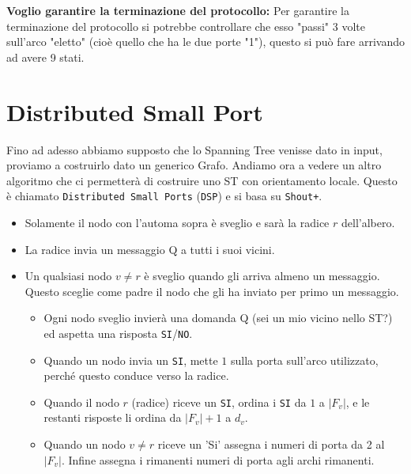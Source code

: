 \textbf{Voglio garantire la terminazione del protocollo: }
Per garantire la terminazione del protocollo si potrebbe controllare che esso
"passi" 3 volte sull'arco "eletto" (cioè quello che ha le due porte "1"), questo
si può fare arrivando ad avere 9 stati.

\section{Distributed Small Port}
Fino ad adesso abbiamo supposto che lo Spanning Tree venisse dato in input,
proviamo a costruirlo dato un generico Grafo. Andiamo ora a vedere un altro
algoritmo che ci permetterà di costruire uno ST con orientamento locale. Questo
è chiamato \texttt{Distributed Small Ports} (\texttt{DSP}) e si basa su
\texttt{Shout+}.
\begin{itemize}
    \item Solamente il nodo con l'automa sopra è sveglio e sarà la radice $r$
          dell'albero.
    \item La radice invia un messaggio Q a tutti i suoi vicini.
    \item Un qualsiasi nodo $v \neq r$ è sveglio quando gli arriva almeno un
          messaggio. Questo sceglie come padre il nodo che gli ha inviato per
          primo un messaggio.
          \begin{itemize}
              \item Ogni nodo sveglio invierà una domanda Q (sei un mio vicino
                    nello ST?) ed aspetta una risposta \texttt{SI}/\texttt{NO}.
              \item Quando un nodo invia un \texttt{SI}, mette $1$ sulla porta
                    sull'arco utilizzato, perché questo conduce verso la radice.
              \item Quando il nodo $r$ (radice) riceve un \texttt{SI}, ordina i
                    \texttt{SI} da $1$ a $|F_v|$, e le restanti risposte li
                    ordina da $|F_v|+1$ a $d_v$.
              \item Quando un nodo $v \neq r$ riceve un 'Si' assegna i numeri di
                    porta da 2 al $|F_v|$. Infine assegna i rimanenti numeri di
                    porta agli archi rimanenti.
          \end{itemize}
\end{itemize}

